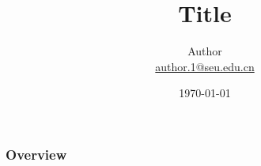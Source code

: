 \documentclass[10pt]{beamer}
\title[Title]{Title}
\theoremstyle{remark}
\theoremstyle{definition}
\begin{document}
\author[Author]{
	\begin{tabular}{c} 
	\Large
	Author\\
    \footnotesize \href{mailto:author.1@seu.edu.cn}{author.1@seu.edu.cn} \\
\end{tabular}
\vspace{-4ex}}


\date{\today}

\begin{noheadline}
\begin{frame} \maketitle \end{frame}
\end{noheadline}

\begin{frame}
	\frametitle{Overview} %
	\tableofcontents %
\end{frame}
\end{document}
